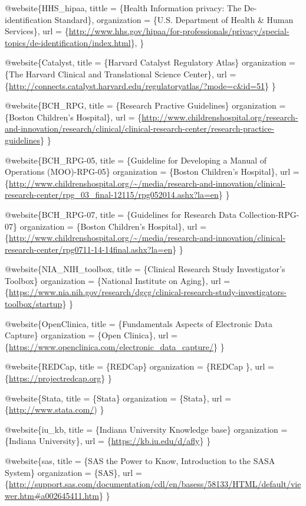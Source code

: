 \documentclass[]{book}
\theoremstyle{definition}
\theoremstyle{definition}
\theoremstyle{definition}
\theoremstyle{remark}
\begin{document}
@website\{HHS\_hipaa, tittle = \{Health Information privacy: The
De-identification Standard\}, organization = \{U.S. Department of Health
\& Human Services\}, url =
\{\url{http://www.hhs.gov/hipaa/for-professionals/privacy/special-topics/de-identification/index.html}\},
\}

@website\{Catalyst, title = \{Harvard Catalyst Regulatory Atlas\}
organization = \{The Harvard Clinical and Translational Science
Center\}, url =
\{\url{http://connects.catalyst.harvard.edu/regulatoryatlas/?mode=c\&id=51}\}
\}

@website\{BCH\_RPG, title = \{Research Practive Guidelines\}
organization = \{Boston Children's Hospital\}, url =
\{\url{http://www.childrenshospital.org/research-and-innovation/research/clinical/clinical-research-center/research-practice-guidelines}\}
\}

@website\{BCH\_RPG-05, title = \{Guideline for Developing a Manual of
Operations (MOO)-RPG-05\} organization = \{Boston Children's Hospital\},
url =
\{\url{http://www.childrenshospital.org/~/media/research-and-innovation/clinical-research-center/rpg_03_final-12115/rpg052014.ashx?la=en}\}
\}

@website\{BCH\_RPG-07, title = \{Guidelines for Research Data
Collection-RPG-07\} organization = \{Boston Children's Hospital\}, url =
\{\url{http://www.childrenshospital.org/~/media/research-and-innovation/clinical-research-center/rpg0711-14-14final.ashx?la=en}\}
\}

@website\{NIA\_NIH\_toolbox, title = \{Clinical Research Study
Investigator's Toolbox\} organization = \{National Institute on Aging\},
url =
\{\url{https://www.nia.nih.gov/research/dgcg/clinical-research-study-investigators-toolbox/startup}\}
\}

@website\{OpenClinica, title = \{Fundamentals Aspects of Electronic Data
Capture\} organization = \{Open Clinica\}, url =
\{\url{https://www.openclinica.com/electronic_data_capture/}\} \}

@website\{REDCap, title = \{REDCap\} organization = \{REDCap \}, url =
\{\url{https://projectredcap.org}\} \}

@website\{Stata, title = \{Stata\} organization = \{Stata\}, url =
\{\url{http://www.stata.com/}) \}

@website\{iu\_kb, title = \{Indiana University Knowledge base\}
organization = \{Indiana University\}, url =
\{\url{https://kb.iu.edu/d/afly}\} \}

@website\{sas, title = \{SAS the Power to Know, Introduction to the SASA
System\} organization = \{SAS\}, url =
\{\url{http://support.sas.com/documentation/cdl/en/basess/58133/HTML/default/viewer.htm\#a002645411.htm}\}
\}
\end{document}

